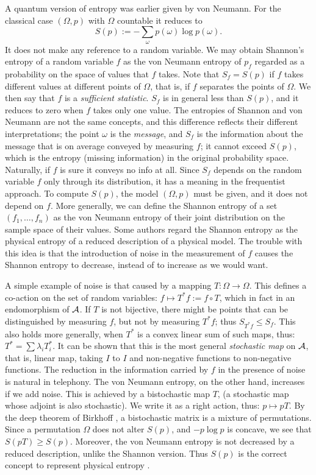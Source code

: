A quantum version of entropy was earlier given by von Neumann.
For the classical case $(\Omega,p)$ with $\Omega$ countable it reduces to
\begin{equation}
S(p):=-\sum_\omega p(\omega)\log p(\omega).
\end{equation}
It does not make any reference to a random variable. We may obtain
Shannon's entropy of a random variable $f$ as the von Neumann entropy of
$p_f$ regarded as a probability on the space of values that $f$ takes.
Note that $S_f=S(p)$ if $f$ takes different values at
different points of $\Omega$, that is, if $f$ separates the points of
$\Omega$. We then say that $f$ is a {\em sufficient statistic}. $S_f$ is in
general less than $S(p)$, and it reduces to zero when
$f$ takes only one value. The entropies of Shannon and von Neumann are not
the same concepts, and this difference reflects their different
interpretations; the point $\omega$ is the {\em message},
and $S_f$ is the information about the message that is
on average conveyed by measuring $f$; it cannot exceed $S(p)$, which is the
entropy (missing information) in the original probability space. Naturally,
if $f$ is sure it conveys no info at all. Since 
$S_f$ depends on the random variable $f$ only through its distribution, it
has a meaning in the frequentist approach.
To compute $S(p)$, the model $(\Omega,p)$ must be given, and it
does not depend on $f$. More generally, we can define the Shannon entropy
of a set $(f_1,\ldots,f_n)$ as the von Neumann entropy of their joint
distribution on the sample space of their values. Some authors regard the
Shannon entropy as the physical entropy of a reduced
description of a physical model. The trouble with this idea
is that the introduction of noise in the measurement of $f$
causes the Shannon entropy to decrease, instead of to increase as we would
want.
 
A simple example of noise is that caused by a mapping $T:\Omega
\rightarrow\Omega$. This defines a co-action on the set of random variables:
$f\mapsto T^*f:=f\circ T$, which in fact in an endomorphism of ${\cal A}$.
If $T$ is not bijective, there might be points that can be distinguished
by measuring $f$, but not by measuring $T^*f$;
thus $S_{T^*f}\leq S_f$. This also holds more generally, when $T^*$ is a
convex linear sum of such maps, thus: $T^*=\sum\lambda_iT_i^*$. It can be
shown that this is the most general {\em stochastic map} on ${\cal A}$,
that is, linear map,
taking $I$ to $I$ and non-negative functions to non-negative functions.
The reduction in the information carried by $f$ in the presence of noise
is natural in telephony. The von Neumann entropy, on the other hand,
increases if we add noise. This is achieved by a bistochastic map $T$,
(a stochastic map whose adjoint is also stochastic). We write it as
a right action, thus: $p\mapsto pT$.
By the deep theorem
of Birkhoff \cite{Birkhoff,Ando}, a bistochastic matrix is a mixture of
permutations. Since a permutation $\Omega$ does not alter $S(p)$, and
$-p\log p$ is concave, we see that $S(pT)\geq S(p)$. Moreover,
the von Neumann entropy is not decreased by a reduced description, unlike
the Shannon version. Thus $S(p)$ is the
correct concept to represent physical entropy \cite{Streater}.

